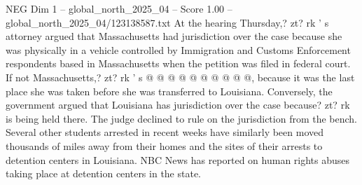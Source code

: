\begin{textsample}{NEG Dim 1 – global\_north\_2025\_04 – Score 1.00 – global\_north\_2025\_04/123138587.txt}
At the hearing Thursday,? zt? rk ' s attorney argued that Massachusetts had jurisdiction over the case because she was physically in a vehicle controlled by Immigration and Customs Enforcement respondents based in Massachusetts when the petition was filed in federal court.
If not Massachusetts,? zt? rk ' s @ @ @ @ @ @ @ @ @ @, because it was the last place she was taken before she was transferred to Louisiana.
Conversely, the government argued that Louisiana has jurisdiction over the case because? zt? rk is being held there.
The judge declined to rule on the jurisdiction from the bench.
Several other students arrested in recent weeks have similarly been moved thousands of miles away from their homes and the sites of their arrests to detention centers in Louisiana.
NBC News has reported on human rights abuses taking place at detention centers in the state.

\end{textsample}
